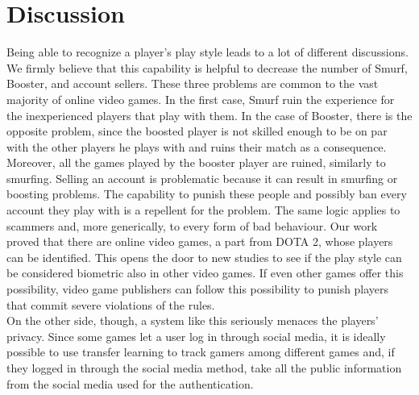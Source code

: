 
\chapter{Discussion}
\label{cap:results}



Being able to recognize a player's play style leads to a lot of different discussions. \\
We firmly believe that this capability is helpful to decrease the number of \gls{Smurf}, \gls{Booster}, and account sellers. 
These three problems are common to the vast majority of online video games. 
In the first case, \gls{Smurf} ruin the experience for the inexperienced players that play with them. 
In the case of \gls{Booster}, there is the opposite problem, since the boosted player is not skilled enough to be on par with the other players he plays with and ruins their match as a consequence. 
Moreover, all the games played by the booster player are ruined, similarly to smurfing. 
Selling an account is problematic because it can result in smurfing or boosting problems.
The capability to punish these people and possibly ban every account they play with is a repellent for the problem. 
The same logic applies to scammers and, more generically, to every form of bad behaviour.
Our work proved that there are online video games, a part from DOTA 2, whose players can be identified. 
This opens the door to new studies to see if the play style can be considered biometric also in other video games. 
If even other games offer this possibility, video game publishers can follow this possibility to punish players that commit severe violations of the rules.\\
On the other side, though, a system like this seriously menaces the players' privacy. 
Since some games let a user log in through social media, it is ideally possible to use transfer learning to track gamers among different games and, 
if they logged in through the social media method, take all the public information from the social media used for the authentication.
